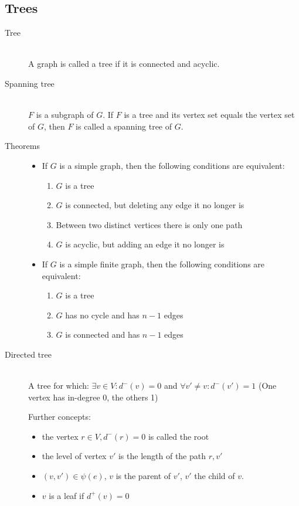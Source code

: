 \documentclass[margin=0px]{article}
\begin{document}
\subsection{Trees}
\begin{description}
    \item[Tree]\hfill \\
    A graph is called a tree if it is connected and acyclic.
    \item[Spanning tree] \hfill \\
        $F$ is a subgraph of $G$. If $F$ is a tree and its vertex set equals the vertex set of $G$, then $F$ is called a spanning tree of $G$.
    \item[Theorems] \hfill
        \begin{itemize}
            \item If $G$ is a simple graph, then the following conditions are equivalent:
                  \begin{enumerate}
                      \item $G$ is a tree
                      \item $G$ is connected, but deleting any edge it no longer is
                      \item Between two distinct vertices there is only one path
                      \item $G$ is acyclic, but adding an edge it no longer is
                  \end{enumerate}
            \item If $G$ is a simple finite graph, then the following conditions are equivalent:
                  \begin{enumerate}
                      \item $G$ is a tree
                      \item $G$ has no cycle and has $n-1$ edges
                      \item $G$ is connected and has $n-1$ edges
                  \end{enumerate}
        \end{itemize}
    \item[Directed tree] \hfill \\
        A tree for which: $\exists v \in V : d^-(v) = 0$ and $\forall v'\neq v : d^-(v') = 1$
        (One vertex has in-degree 0, the others 1)

        Further concepts:
        \begin{itemize}
            \item the vertex $r \in V, d^-(r) = 0 $ is called the root
            \item the level of vertex $v'$ is the length of the path $r,v'$
            \item $(v,v')\in\psi(e)$, $v$ is the parent of $v'$, $v'$ the child of $v$.
            \item $v$ is a leaf if $d^+(v)=0$
        \end{itemize}
\end{description}
\end{document}
